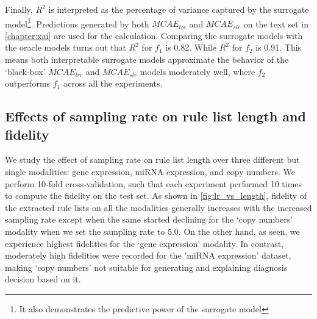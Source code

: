\hspace*{3.5mm} Finally, $R^2$ is interpreted as the percentage of variance captured by the surrogate model\footnote{It also demonstrates the predictive power of the surrogate model}. Predictions generated by both $MCAE_{lrc}$ and $MCAE_{slr}$ on the text set in \cref{chapter:xai} are used for the calculation. Comparing the surrogate models with the oracle models turns out that $R^2$ for $f_1$ is 0.82. While $R^2$ for $f_2$ is 0.91. This means both interpretable surrogate models approximate the behavior of the `black-box' $MCAE_{lrc}$ and $MCAE_{slr}$ models moderately well, where $f_2$ outperforms $f_1$ across all the experiments. 

\subsection{Effects of sampling rate on rule list length and fidelity}
We study the effect of sampling rate on rule list length over three different but single modalities: gene expression, miRNA expression, and copy numbers. We perform 10-fold cross-validation, such that each experiment performed 10 times to compute the fidelity on the test set. As shown in \cref{fig:lr_vs_length}, fidelity of the extracted rule lists on all the modalities generally increases with the increased sampling rate except when the same started declining for the `copy numbers' modality when we set the sampling rate to 5.0. On the other hand, as seen, we experience highest fidelities for the `gene expression' modality. In contrast, moderately high fidelities were recorded for the 'miRNA expression' dataset, making `copy numbers' not suitable for generating and explaining diagnosis decision based on it. 

